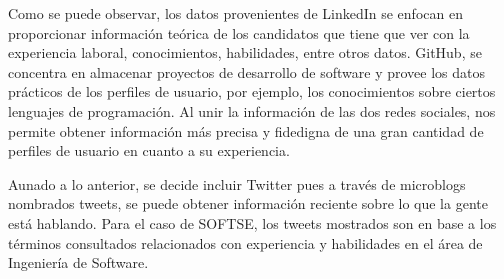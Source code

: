 \begin{figure}[H]

\label{fig:multiRH02}
\end{figure}

Como se puede observar, los datos provenientes de LinkedIn se enfocan en proporcionar informaci\'on te\'orica de los candidatos que tiene que ver con la experiencia laboral, conocimientos, habilidades, entre otros datos. GitHub, se concentra en almacenar proyectos de desarrollo de software y provee los datos prácticos de los perfiles de usuario, por ejemplo, los conocimientos sobre ciertos lenguajes de programación. Al unir la información de las dos redes sociales, nos permite obtener información más precisa y fidedigna de una gran cantidad de perfiles de usuario en cuanto a su experiencia.

Aunado a lo anterior, se decide incluir Twitter pues a través de microblogs nombrados tweets, se puede obtener información reciente sobre lo que la gente está hablando. Para el caso de SOFTSE, los tweets mostrados son en base a los términos consultados relacionados con experiencia y habilidades en el área de Ingeniería de Software.

